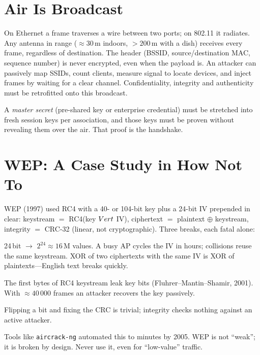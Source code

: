 {\sloppy
\section{Air Is Broadcast}\label{sec:air}
On Ethernet a frame traverses a wire between two ports; on 802.11 it radiates. Any antenna in range ($\approx 30$\,m indoors, $>200$\,m with a dish) receives every frame, regardless of destination. The header (BSSID, source/destination MAC, sequence number) is never encrypted, even when the payload is. An attacker can passively map SSIDs, count clients, measure signal to locate devices, and inject frames by waiting for a clear channel. Confidentiality, integrity and authenticity must be retrofitted onto this broadcast.

A \emph{master secret} (pre-shared key or enterprise credential) must be stretched into fresh session keys per association, and those keys must be proven without revealing them over the air. That proof is the handshake.

\section{WEP: A Case Study in How Not To}\label{sec:wep}
WEP (1997) used RC4 with a 40- or 104-bit key plus a 24-bit IV prepended in clear: keystream $=$ RC4(key $\\Vert$ IV), ciphertext $=$ plaintext $\oplus$ keystream, integrity $=$ CRC-32 (linear, not cryptographic). Three breaks, each fatal alone:

\begin{description}[leftmargin=1.2em, itemsep=0.3em]
    \item[Small IV, no replay protection] 24\,bit $\to$ $2^{24}\approx16$\,M values. A busy AP cycles the IV in hours; collisions reuse the same keystream. XOR of two ciphertexts with the same IV is XOR of plaintexts---English text breaks quickly.
    \item[RC4 weak keys + related-key] The first bytes of RC4 keystream leak key bits (Fluhrer--Mantin--Shamir, 2001). With $\approx40\,000$ frames an attacker recovers the key passively.
    \item[Linear CRC] Flipping a bit and fixing the CRC is trivial; integrity checks nothing against an active attacker.
\end{description}

Tools like \texttt{aircrack-ng} automated this to minutes by 2005. WEP is not ``weak''; it is broken by design. Never use it, even for ``low-value'' traffic.

}
